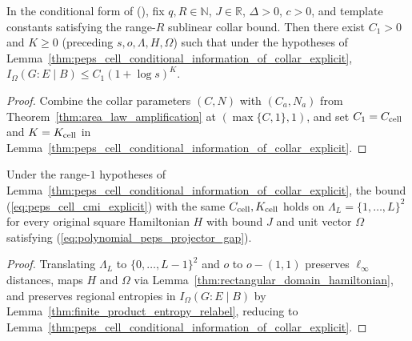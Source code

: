 \begin{lemma}
    \label{thm:peps_cell_conditional_information_of_collar}
    \leanok
    In the conditional form of \cite[Lemma~3.2]{OpenAI2026PolynomialPEPS}
    (\cite{gap:polypeps_angular_annular_geometry_scope}), fix
    $q,R\in\mathbb N$, $J\in\mathbb R$, $\Delta>0$, $c>0$, and template constants
    satisfying the range-$R$ sublinear collar bound.
    Then there exist $C_1>0$ and $K\ge0$ (preceding $s,o,\Lambda,H,\Omega$) such that under the hypotheses of Lemma~\ref{thm:peps_cell_conditional_information_of_collar_explicit},
    $I_\Omega(G:E\mid B)\le C_1(1+\log s)^K$.
\end{lemma}
\begin{proof}\leanok
    Combine the collar parameters $(C,N)$ with $(C_a,N_a)$ from
    Theorem~\ref{thm:area_law_amplification} at $(\max\{C,1\},1)$, and set $C_1=C_{\rm cell}$ and $K=K_{\rm cell}$ in
    Lemma~\ref{thm:peps_cell_conditional_information_of_collar_explicit}.
\end{proof}

\begin{lemma}
    \label{thm:peps_square_cell_conditional_information_of_collar_explicit}
    \leanok
    Under the range-$1$ hypotheses of Lemma~\ref{thm:peps_cell_conditional_information_of_collar_explicit}, the bound (\ref{eq:peps_cell_cmi_explicit}) with the same $C_{\rm cell},K_{\rm cell}$ holds on $\Lambda_L=\{1,\ldots,L\}^2$ for every original square Hamiltonian $H$ with bound $J$ and unit vector $\Omega$ satisfying (\ref{eq:polynomial_peps_projector_gap}).
\end{lemma}
\begin{proof}\leanok
    Translating $\Lambda_L$ to $\{0,\ldots,L-1\}^2$ and $o$ to $o-(1,1)$ preserves $\ell_\infty$ distances, maps $H$ and $\Omega$ via Lemma~\ref{thm:rectangular_domain_hamiltonian}, and preserves regional entropies in $I_\Omega(G:E\mid B)$ by Lemma~\ref{thm:finite_product_entropy_relabel}, reducing to Lemma~\ref{thm:peps_cell_conditional_information_of_collar_explicit}.
\end{proof}

